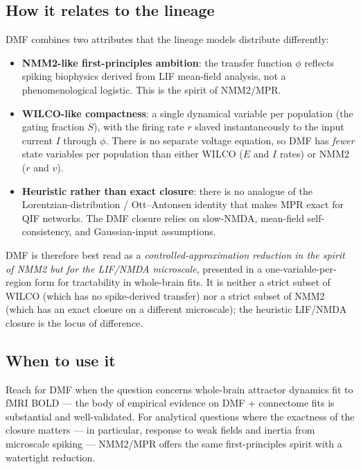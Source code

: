 \documentclass[11pt,a4paper]{article}
\begin{document}
\subsection{How it relates to the lineage}

DMF combines two attributes that the lineage models distribute differently:
\begin{itemize}
\item \textbf{NMM2-like first-principles ambition}: the transfer function $\phi$ reflects spiking biophysics derived from LIF mean-field analysis, not a phenomenological logistic. This is the spirit of NMM2/MPR.
\item \textbf{WILCO-like compactness}: a single dynamical variable per population (the gating fraction $S$), with the firing rate $r$ slaved instantaneously to the input current $I$ through $\phi$. There is no separate voltage equation, so DMF has \emph{fewer} state variables per population than either WILCO ($E$ and $I$ rates) or NMM2 ($r$ and $v$).
\item \textbf{Heuristic rather than exact closure}: there is no analogue of the Lorentzian-distribution / Ott--Antonsen identity that makes MPR exact for QIF networks. The DMF closure relies on slow-NMDA, mean-field self-consistency, and Gaussian-input assumptions.
\end{itemize}
DMF is therefore best read as a \emph{controlled-approximation reduction in the spirit of NMM2 but for the LIF/NMDA microscale}, presented in a one-variable-per-region form for tractability in whole-brain fits. It is neither a strict subset of WILCO (which has no spike-derived transfer) nor a strict subset of NMM2 (which has an exact closure on a different microscale); the heuristic LIF/NMDA closure is the locus of difference.

\subsection{When to use it}

Reach for DMF when the question concerns whole-brain attractor dynamics fit to fMRI BOLD --- the body of empirical evidence on DMF + connectome fits is substantial and well-validated\cite{Deco2013}. For analytical questions where the exactness of the closure matters --- in particular, response to weak fields and inertia from microscale spiking --- NMM2/MPR offers the same first-principles spirit with a watertight reduction.

\end{document}
